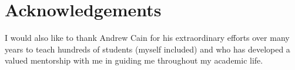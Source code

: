 \chapter*{Acknowledgements}

\blindtext


I would also like to thank Andrew Cain for his extraordinary efforts over many years to teach hundreds of students (myself included) and who has developed a valued mentorship with me in guiding me throughout my academic life.
